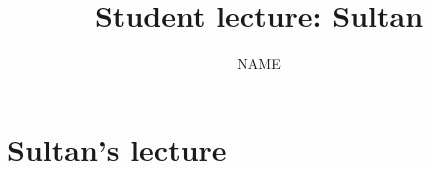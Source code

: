 \documentclass[11pt,reqno,oneside,a4paper]{article}
\title{Student lecture: Sultan}
\author{NAME}
\begin{document}

\maketitle
\thispagestyle{fancy}


\section{Sultan's lecture} \label{sec:Sultan}

\end{document}
